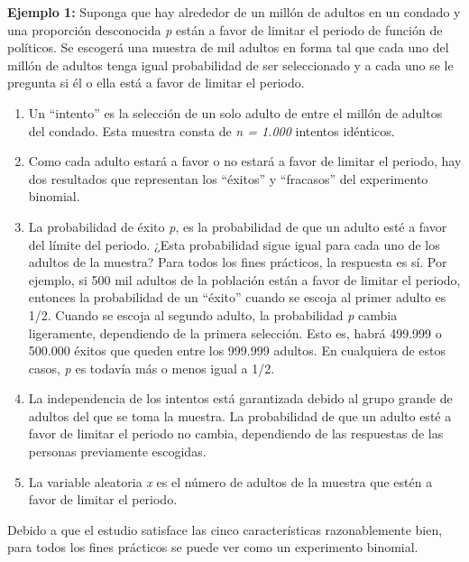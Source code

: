 \documentclass[]{article}
\begin{document}
 \textbf{Ejemplo 1:} Suponga que hay alrededor de un millón de adultos en un condado y una proporción desconocida \textit{p} están a favor de limitar el periodo de función de políticos. Se escogerá una muestra de mil adultos en forma tal que cada uno del millón de adultos tenga igual probabilidad de ser seleccionado y a cada uno se le pregunta si él o ella está a favor de limitar el periodo.
 \begin{enumerate}
 	\item Un “intento” es la selección de un solo adulto de entre el millón de adultos del condado. Esta muestra consta de \textit{n = 1.000} intentos idénticos.
 	\item Como cada adulto estará a favor o no estará a favor de limitar el periodo, hay dos resultados que representan los “éxitos” y “fracasos” del experimento binomial.
 	\item La probabilidad de éxito \textit{p}, es la probabilidad de que un adulto esté a favor del límite del periodo. ¿Esta probabilidad sigue igual para cada uno de los adultos de la muestra? Para todos los fines prácticos, la respuesta es sí. Por ejemplo, si 500 mil adultos de la población están a favor de limitar el periodo, entonces la probabilidad de un “éxito” cuando se escoja al primer adulto es 1/2. Cuando se escoja al segundo adulto, la probabilidad \textit{p} cambia ligeramente, dependiendo de la primera selección. Esto es, habrá 499.999 o 500.000 éxitos que queden entre los 999.999 adultos. En cualquiera de estos casos, \textit{p} es todavía más o menos igual a 1/2.
 	\item La independencia de los intentos está garantizada debido al grupo grande de adultos del que se toma la muestra. La probabilidad de que un adulto esté a favor de limitar el periodo no cambia, dependiendo de las respuestas de las personas previamente escogidas.
 	\item La variable aleatoria \textit{x} es el número de adultos de la muestra que estén a favor de limitar el periodo.
 \end{enumerate}
 Debido a que el estudio satisface las cinco características razonablemente bien, para todos los fines prácticos se puede ver como un experimento binomial.
 
\end{document}
